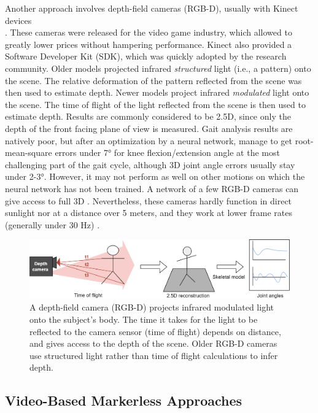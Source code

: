 Another approach involves depth-field cameras (RGB-D), usually with Kinect devices \\\cite{Kinect}. These cameras were released for the video game industry, which allowed to greatly lower prices without hampering performance. Kinect also provided a Software Developer Kit (SDK), which was quickly adopted by the research community. Older models projected infrared \textit{structured} light (i.e., a pattern) onto the scene. The relative deformation of the pattern reflected from the scene was then used to estimate depth. Newer models project infrared \textit{modulated} light onto the scene. The time of flight of the light reflected from the scene is then used to estimate depth. Results are commonly considered to be 2.5D, since only the depth of the front facing plane of view is measured. Gait analysis results are natively poor, but after an optimization by a neural network, \cite{Guo2022} manage to get root-mean-square errors under 7° for knee flexion/extension angle at the most challenging part of the gait cycle, although 3D joint angle errors usually stay under 2-3°. However, it may not perform as well on other motions on which the neural network has not been trained. A network of a few RGB-D cameras can give access to full 3D \cite{Carraro2017,Choppin2013,Colombel2020}. Nevertheless, these cameras hardly function in direct sunlight nor at a distance over 5 meters, and they work at lower frame rates (generally under 30 Hz) \cite{Han2013, Pagliari2015}. 

\begin{figure}[hbtp]
	\centering
	\def\svgwidth{1\columnwidth}
	\fontsize{10pt}{10pt}\selectfont
	\includegraphics[width=\linewidth]{"../Chap1/Figures/Fig_Depth.png"}
	\caption{A depth-field camera (RGB-D) projects infrared modulated light onto the subject's body. The time it takes for the light to be reflected to the camera sensor (time of flight) depends on distance, and gives access to the depth of the scene.	Older RGB-D cameras use structured light rather than time of flight calculations to infer depth.}
	\label{fig_depth}
\end{figure}

\FloatBarrier
\subsection{Video-Based Markerless Approaches}

